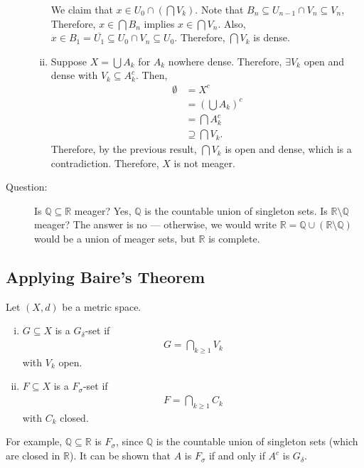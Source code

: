 \documentclass[8pt]{extarticle}
\newcommand{\Q}{\mathbb{Q}}
\newcommand{\R}{\mathbb{R}}
\begin{document}
\begin{description}
\begin{enumerate}[(i)]
          We claim that $x\in U_{0}\cap \left(\bigcap V_k\right)$. Note that $B_n \subseteq U_{n-1}\cap V_n \subseteq V_n$, Therefore, $x\in \bigcap B_n$ implies $x\in \bigcap V_n$. Also, $x\in B_1=\overline{U_1} \subseteq U_0\cap V_n \subseteq U_0$. Therefore, $\bigcap V_k$ is dense.
        \item Suppose $X = \bigcup A_k$ for $A_k$ nowhere dense. Therefore, $\exists V_k$ open and dense with $V_k\subseteq A_k^c$. Then,
          \begin{align*}
            \emptyset &= X^c\\
                      &= \left(\bigcup A_k\right)^c\\
                      &= \bigcap A_k^c\\
                      &\supseteq \bigcap V_k.
          \end{align*}
          Therefore, by the previous result, $\bigcap V_k$ is open and dense, which is a contradiction. Therefore, $X$ is not meager.
      \end{enumerate}
    \item[Question:] Is $\Q\subseteq \R$ meager? Yes, $\Q$ is the countable union of singleton sets. Is $\R\setminus \Q$ meager? The answer is no --- otherwise, we would write $\R = \Q \cup (\R\setminus \Q)$ would be a union of meager sets, but $\R$ is complete.
  \end{description}
  \subsection{Applying Baire's Theorem}%
  Let $(X,d)$ be a metric space.
  \begin{enumerate}[(i)]
    \item $G\subseteq X$ is a $G_{\delta}$-set if
      \begin{align*}
        G = \bigcap_{k\geq 1} V_k
      \end{align*}
      with $V_k$ open.
    \item $F\subseteq X$ is a $F_{\sigma}$-set if
      \begin{align*}
        F = \bigcap_{k\geq 1}C_k
      \end{align*}
      with $C_k$ closed.
  \end{enumerate}
  For example, $\Q\subseteq \R$ is $F_{\sigma}$, since $\Q$ is the countable union of singleton sets (which are closed in $\R$). It can be shown that $A$ is $F_{\sigma}$ if and only if $A^{c}$ is $G_{\delta}$.\\ 
\end{document}
